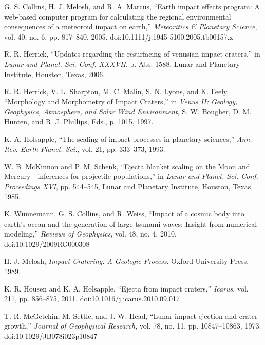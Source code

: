 \documentclass[conference]{IEEEtran}
\begin{document}
\begin{thebibliography}{00}

	G. S. Collins, H. J. Melosh, and R. A. Marcus, ``Earth impact effects program: A web-based computer program for calculating the regional environmental consequences of a meteoroid impact on earth,'' \textit{Meteoritics \& Planetary Science}, vol. 40, no. 6, pp. 817--840, 2005. doi:10.1111/j.1945-5100.2005.tb00157.x

	R. R. Herrick, ``Updates regarding the resurfacing of venusian impact craters,'' in \textit{Lunar and Planet. Sci. Conf. XXXVII}, p. Abs. 1588, Lunar and Planetary Institute, Houston, Texas, 2006.

	R. R. Herrick, V. L. Sharpton, M. C. Malin, S. N. Lyons, and K. Feely, ``Morphology and Morphometry of Impact Craters,'' in \textit{Venus II: Geology, Geophysics, Atmosphere, and Solar Wind Environment}, S. W. Bougher, D. M. Hunten, and R. J. Phillips, Eds., p. 1015, 1997.

	K. A. Holsapple, ``The scaling of impact processes in planetary sciences,'' \textit{Ann. Rev. Earth Planet. Sci.}, vol. 21, pp. 333--373, 1993.

	W. B. McKinnon and P. M. Schenk, ``Ejecta blanket scaling on the Moon and Mercury - inferences for projectile populations,'' in \textit{Lunar and Planet. Sci. Conf. Proceedings XVI}, pp. 544--545, Lunar and Planetary Institute, Houston, Texas, 1985.

	K. Wünnemann, G. S. Collins, and R. Weiss, ``Impact of a cosmic body into earth’s ocean and the generation of large tsunami waves: Insight from numerical modeling,'' \textit{Reviews of Geophysics}, vol. 48, no. 4, 2010. doi:10.1029/2009RG000308

	H. J. Melosh, \textit{Impact Cratering: A Geologic Process}. Oxford University Press, 1989.

	K. R. Housen and K. A. Holsapple, ``Ejecta from impact craters,'' \textit{Icarus}, vol. 211, pp. 856--875, 2011. doi:10.1016/j.icarus.2010.09.017

	T. R. McGetchin, M. Settle, and J. W. Head, ``Lunar impact ejection and crater growth,'' \textit{Journal of Geophysical Research}, vol. 78, no. 11, pp. 10847--10863, 1973. doi:10.1029/JB078i023p10847


\end{thebibliography}
\end{document}
